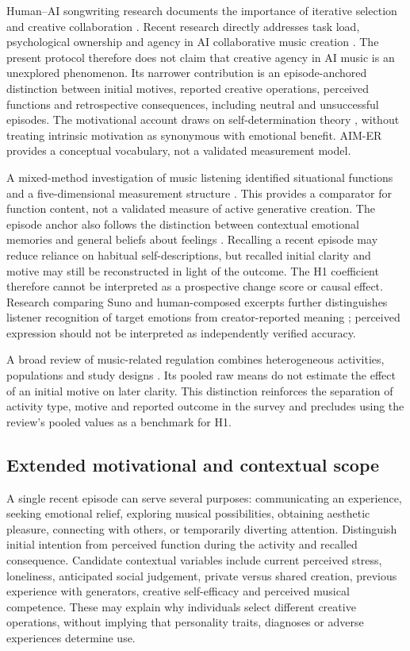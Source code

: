 \documentclass[11pt,a4paper]{article}
\begin{document}
Human--AI songwriting research documents the importance of iterative selection and creative collaboration \parencite{huang2020}. Recent research directly addresses task load, psychological ownership and agency in AI collaborative music creation \parencite{he2026}. The present protocol therefore does not claim that creative agency in AI music is an unexplored phenomenon. Its narrower contribution is an episode-anchored distinction between initial motives, reported creative operations, perceived functions and retrospective consequences, including neutral and unsuccessful episodes. The motivational account draws on self-determination theory \parencite{ryan2000}, without treating intrinsic motivation as synonymous with emotional benefit. AIM-ER provides a conceptual vocabulary, not a validated measurement model.

A mixed-method investigation of music listening identified situational functions and a five-dimensional measurement structure \parencite{henry2024}. This provides a comparator for function content, not a validated measure of active generative creation. The episode anchor also follows the distinction between contextual emotional memories and general beliefs about feelings \parencite{robinson2002}. Recalling a recent episode may reduce reliance on habitual self-descriptions, but recalled initial clarity and motive may still be reconstructed in light of the outcome. The H1 coefficient therefore cannot be interpreted as a prospective change score or causal effect. Research comparing Suno and human-composed excerpts further distinguishes listener recognition of target emotions from creator-reported meaning \parencite{qi2026}; perceived expression should not be interpreted as independently verified accuracy.

A broad review of music-related regulation combines heterogeneous activities, populations and study designs \parencite{feng2026}. Its pooled raw means do not estimate the effect of an initial motive on later clarity. This distinction reinforces the separation of activity type, motive and reported outcome in the survey and precludes using the review's pooled values as a benchmark for H1.

\subsection{Extended motivational and contextual scope}
A single recent episode can serve several purposes: communicating an experience, seeking emotional relief, exploring musical possibilities, obtaining aesthetic pleasure, connecting with others, or temporarily diverting attention. Distinguish initial intention from perceived function during the activity and recalled consequence. Candidate contextual variables include current perceived stress, loneliness, anticipated social judgement, private versus shared creation, previous experience with generators, creative self-efficacy and perceived musical competence. These may explain why individuals select different creative operations, without implying that personality traits, diagnoses or adverse experiences determine use.
\end{document}
